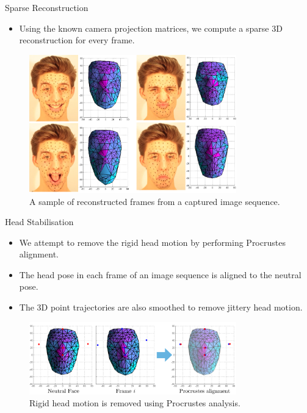 \documentclass{beamer}
\begin{document}
\begin{frame}{Sparse Reconstruction}

\begin{itemize}
\setlength\itemsep{0.5em}
\item Using the known camera projection matrices, we compute a sparse 3D reconstruction for every frame.
\end{itemize}

\begin{center}
\begin{figure}
\includegraphics[width=0.8\textwidth]{img/faces}
\caption{\tiny{A sample of reconstructed frames from a captured image sequence.}}
\end{figure}
\end{center}

\end{frame}



\begin{frame}{Head Stabilisation}

\begin{itemize}
\setlength\itemsep{0.5em}
\item We attempt to remove the rigid head motion by performing Procrustes alignment.
\item The head pose in each frame of an image sequence is aligned to the neutral pose. 
\item The 3D point trajectories are also smoothed to remove jittery head motion. 
\end{itemize}

\begin{center}
\begin{figure}
\includegraphics[width=0.8\textwidth]{img/procrustes}
\caption{\tiny{Rigid head motion is removed using Procrustes analysis.}}
\end{figure}
\end{center}

\end{frame}
\end{document}

